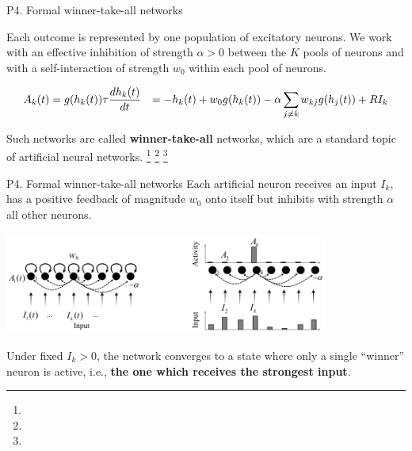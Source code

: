 \documentclass[xcolor=table,dvipsnames,svgnames,aspectratio=169,fontset=fandol]{ctexbeamer}
\let\\\relax
\begin{document}
\begin{frame}{P4. Formal winner-take-all networks}

  Each outcome is represented by one population of excitatory neurons. We work with an effective inhibition of strength $\alpha > 0$ between the $K$ pools of neurons and with a self-interaction of strength $w_0$ within each pool of neurons.

  \begin{equation}
    \begin{aligned}
      A_k(t)&=g(h_k(t))\\
      \tau \frac{dh_k(t)}{dt}&=-h_k(t)+w_0g(h_k(t))-\alpha\sum_{j\neq k}w_{kj}g(h_j(t))+RI_k
    \end{aligned}
  \end{equation}

  Such networks are called \textbf{winner-take-all} networks, which are a standard topic of artificial neural networks.
  \footnote{}   
  \footnote{}   
  \footnote{}   
\end{frame}

\begin{frame}{P4. Formal winner-take-all networks}
  Each artificial neuron receives an input $I_k$, has a positive feedback of magnitude $w_0$ onto itself but inhibits with strength $\alpha$ all other neurons.

  \begin{center}
    \includegraphics[width=0.8\textwidth,height=0.5\textheight]{winner.png}
  \end{center}

  Under fixed $I_k>0$, the network converges to a state where only a single “winner” neuron is active, i.e., \textbf{the one which receives the strongest input}.

\end{frame}
\end{document}
